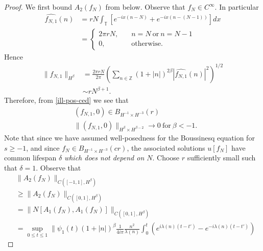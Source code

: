 \documentclass[12pt,reqno]{amsart}
\numberwithin{equation}{section}  %
\newcommand{\zz}{\mathbb{Z}}
\newcommand{\ci}{\mathbb{T}}
\newcommand{\wh}{\widehat}
\begin{document}
\begin{proof}
  We first bound $A_{2}(f_{N})$ from below.
  Observe that $f_{N} \in C^{\infty}$. In particular
%
%
\begin{equation}
  \label{ill-pos-ce}
\begin{split}
  \wh{f_{N,1}}(n)
  & = r N\int_{\ci} [e^{-ix(n - N)} + e^{-ix(n - (N-1))}]  dx  
  \\ 
  & = 
  \begin{cases}
    2 \pi r N,  \quad  & n = N \ \text{or} \ n = N-1
    \\
     0, \quad  & \text{otherwise}.
  \end{cases}
\end{split}
\end{equation}
%
Hence
%
%
\begin{equation}
  \label{ill-pos-ced}
\begin{split}
  \| f_{N,1} \|_{H^{\beta}}
  & = \frac{2 \pi r N}{2 \pi} \left( \sum_{n \in \zz} (1 + | n |)^{2 \beta} |
  \wh{f_{N,1}}(n) |^{2} \right)^{1/2}
  \\
  & \sim rN^{\beta +1}.
\end{split}
\end{equation}
%
%
Therefore, from \eqref{ill-pos-ced} we see that 
\begin{equation*}
  \begin{split}
    & (f_{N,1}, 0) \in B_{H^{-1} \times H^{-3}}(r)
    \\
    & \|(f_{N,1}, 0)\|_{H^{\beta} \times H^{\beta -2}} \to 0 \ \text{for} \ \beta < -1.
    \end{split}
\end{equation*}
Note that since we have assumed well-posedness for the Boussinesq equation for $s
\ge -1$, and since $f_{N} \in B_{H^{-1} \times H^{-3}}(cr)$, the associated
solutions $u[f_{N}]$ have common lifespan $\delta$ \emph{which does not depend
on $N$}. Choose $r$ sufficiently small such that $\delta =1$.  
Observe that
%
%
\begin{equation*}
\begin{split}
  & \| A_{2}(f_{N}) \|_{C([-1, 1], H^{\beta})} 
  \\
& \ge \| A_{2}(f_{N}) \|_{C([0, 1], H^{\beta})} 
\\
  &  =  \| N[A_{1}(f_{N}), A_{1}(f_{N})] \|_{C([0, 1],
  H^{\beta})} 
  \\
  & = \sup_{0 \le t \le 1} \| \psi_{1}(t) (1 + | n |)^{\beta}
  \frac{1}{4 i \pi} \frac{n^{2}}{\lambda(n)}
  \int_{0}^{t} \left( e^{i\lambda(n)(t-t')} - e^{-i\lambda(n)(t-t')} \right)

\end{split}
\end{equation*}
\end{proof}
\end{document}
